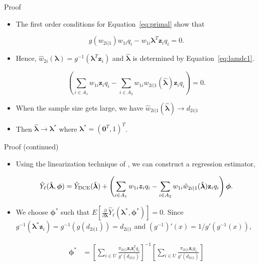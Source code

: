 \documentclass{beamer} %
\renewcommand{\bf}[1]{\mathbf{#1}}
\begin{document}
\begin{frame}{Proof}

  \begin{itemize}
    \item The first order conditions for Equation~\eqref{eq:primal} show that

  $$g(w_{2i|1}) w_{1i}q_i - w_{1i} \bm \lambda^T \bf z_i q_i = 0.$$

  \item Hence, $\hat w_{2i}(\bm \lambda) = g^{-1}(\bm \lambda^T \bf z_i)$ and
  $\hat{\bm \lambda}$ is determined by Equation~\eqref{eq:lamdc1}. 

\begin{equation}\label{eq:lamdc1}
  \left( \sum_{i \in A_1} w_{1i} \bf z_i q_i -
  \sum_{i \in A_2} w_{1i} w_{2i|1}(\hat{\bm \lambda}) \bf z_i q_i\right) = 0.
\end{equation}

  \item When the sample size gets large, we have 
    $\hat w_{2i|1}(\hat{\bm \lambda}) \to d_{2i|1}$ 
  \item Then $\hat{\bm \lambda} \to \bm \lambda^*$ where $\bm
  \lambda^* = (\bf 0^T, 1)^T$. 
\end{itemize}
\end{frame}

\begin{frame}{Proof (continued)}

  \begin{itemize}
  \item Using the linearization technique of
  \cite{randles1982asymptotic}, we can construct a regression estimator, 

  $$\hat Y_\ell(\hat{\bm \lambda}, \bm \phi)  = \hat Y_{\rm{DCE}}(\hat{\bm \lambda}) + 
  \left(\sum_{i \in A_1} w_{1i} \bm z_i q_i - \sum_{i \in A_2} w_{1i} 
  \hat w_{2i|1}(\hat{\bm \lambda}) \bf z_i q_i\right)\bm \phi.$$

  \item We choose $\bm \phi^*$ such that
  $E\left[\frac{\partial}{\partial \bm \lambda} \hat Y_\ell(\bm \lambda^*,
  \bm \phi^*)\right]=0.$ Since $g^{-1}(\bm \lambda^* \bf z_i) =
  g^{-1}(g(d_{2i|1})) = d_{2i|1}$ and $(g^{-1})'(x) = 1 / g'(g^{-1}(x))$,

  \begin{align*}
    \bm \phi^*
    &= \left[\sum_{i \in U} \frac{\pi_{2i|1} \bf z_i \bf z_i^T q_i}{g'(d_{2i|1})}\right]^{-1}
    \left[\sum_{i \in U} \frac{\pi_{2i|1} \bf z_i y_i}{g'(d_{2i|1})}\right]\\
  \end{align*}

\end{itemize}
\end{frame}
\end{document}
